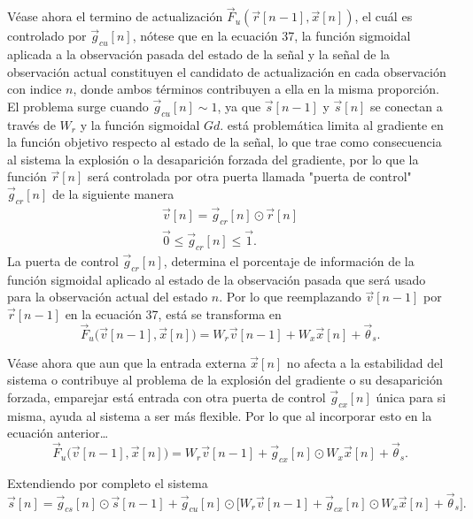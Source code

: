 \documentclass[12pt,letterpaper]{article}
\begin{document}
Véase ahora el termino de actualización $\vec{F}_u(\vec{r}[n-1], \vec{x}[n])$, el cuál es controlado por $\vec{g}_{cu}[n]$, nótese que en la ecuación 37, la función sigmoidal aplicada a la observación pasada del estado de la señal y la señal de la observación actual constituyen el candidato de actualización en cada observación con indice $n$, donde ambos términos contribuyen a ella en la misma proporción. El problema surge cuando $\vec{g}_{cu}[n] \sim 1$, ya que $\vec{s}[n-1]$ y $\vec{s}[n]$ se conectan a través de $W_r$ y la función sigmoidal $Gd$. está problemática limita al gradiente en la función objetivo respecto al estado de la señal, lo que trae como consecuencia al sistema la explosión o la desaparición forzada del gradiente, por lo que la función $\vec{r}[n]$ será controlada por otra puerta llamada "puerta de control" $\vec{g}_{cr}[n]$ de la siguiente manera
\begin{gather}
    \vec{v}[n] = \vec{g}_{cr}[n] \odot \vec{r}[n]\\
    \vec{0} \leq \vec{g}_{cr}[n] \leq \vec{1}.
\end{gather}
La puerta de control $\vec{g}_{cr}[n]$, determina el porcentaje de información de la función sigmoidal aplicado al estado de la observación pasada que será usado para la observación actual del estado $n$. Por lo que reemplazando $\vec{v}[n-1]$ por $\vec{r}[n-1]$ en la ecuación 37, está se transforma en
\begin{equation}
    \vec{F}_u\big( \vec{v}[n-1], \vec{x}[n] \big) = W_r\vec{v}[n-1] + W_x\vec{x}[n]+\vec{\theta}_s.
\end{equation}

Véase ahora que aun que la entrada externa $\vec{x}[n]$ no afecta a la estabilidad del sistema o contribuye al problema de la explosión del gradiente o su desaparición forzada, emparejar está entrada con otra puerta de control $\vec{g}_{cx}[n]$ única para si misma, ayuda al sistema a ser más flexible. Por lo que al incorporar esto en la ecuación anterior\dots
\begin{equation}
    \vec{F}_u\big( \vec{v}[n-1], \vec{x}[n] \big) = W_r\vec{v}[n-1] +  \vec{g}_{cx}[n]\odot W_x\vec{x}[n]+\vec{\theta}_s.
\end{equation}

Extendiendo por completo el sistema 
\begin{equation}
    \vec{s}[n]=\vec{g}_{cs}[n] \odot \vec{s}[n-1] + \vec{g}_{cu}[n] \odot \big[ W_r\vec{v}[n-1] +  \vec{g}_{cx}[n]\odot W_x\vec{x}[n]+\vec{\theta}_s \big].
\end{equation}
\end{document}
